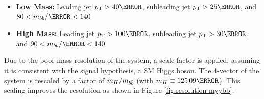 \begin{itemize}
  \item \textbf{Low Mass:} Leading jet $\pt > \unit{40}{\GeV}$, subleading jet $\pt > \unit{25}{\GeV}$, and $80 < m_{bb}/\GeV < 140$
  \item \textbf{High Mass:} Leading jet $\pt > \unit{100}{\GeV}$, subleading jet $\pt > \unit{30}{\GeV}$, and $90 < m_{bb}/\GeV < 140$
\end{itemize}

Due to the poor mass resolution of the \bb system, a scale factor is applied, assuming it is consistent with the signal hypothesis, a \gls{SM} Higgs boson. The 4-vector of the system is rescaled by a factor of $m_{H}/m_{b\bar{b}}$ (with $m_H \equiv \unit{125.09}{\GeV}$). This scaling improves the \myybb resolution as shown in Figure \ref{fig:resolution-myybb}.


